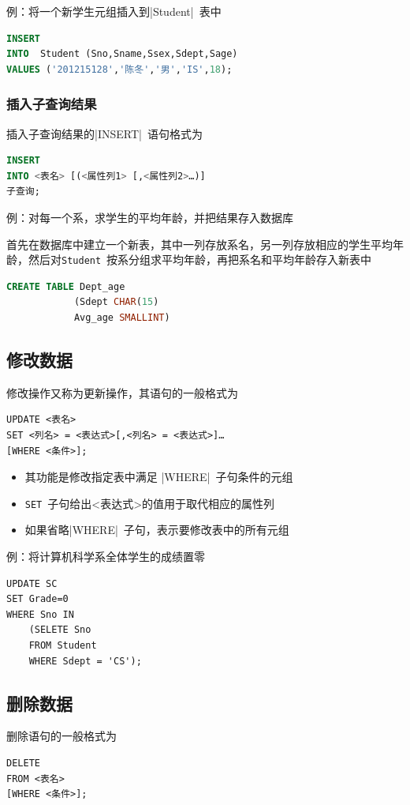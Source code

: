 例：将一个新学生元组插入到\sverb|Student|\ 表中
\begin{lstlisting}[language=sql]
INSERT
INTO  Student (Sno,Sname,Ssex,Sdept,Sage)
VALUES ('201215128','陈冬','男','IS',18);
\end{lstlisting}

\subsubsection{插入子查询结果}
插入子查询结果的\sverb|INSERT|\ 语句格式为
\begin{lstlisting}[language=sql]
INSERT 
INTO <表名> [(<属性列1> [,<属性列2>…)]
子查询;
\end{lstlisting}

例：对每一个系，求学生的平均年龄，并把结果存入数据库

首先在数据库中建立一个新表，其中一列存放系名，另一列存放相应的学生平均年龄，然后对\verb|Student|\ 按系分组求平均年龄，再把系名和平均年龄存入新表中
\begin{lstlisting}[language=sql]
CREATE TABLE Dept_age
            (Sdept CHAR(15)                         
            Avg_age SMALLINT)
\end{lstlisting}

\subsection{修改数据}
修改操作又称为更新操作，其语句的一般格式为
\begin{lstlisting}
UPDATE <表名>
SET <列名> = <表达式>[,<列名> = <表达式>]…
[WHERE <条件>];
\end{lstlisting}
\begin{itemize}
    \item 其功能是修改指定表中满足 \sverb|WHERE|\ 子句条件的元组
    \item \verb|SET|\ 子句给出<表达式>的值用于取代相应的属性列
    \item 如果省略\sverb|WHERE|\ 子句，表示要修改表中的所有元组
\end{itemize}

例：将计算机科学系全体学生的成绩置零
\begin{lstlisting}
UPDATE SC
SET Grade=0
WHERE Sno IN
	(SELETE Sno
    FROM Student
    WHERE Sdept = 'CS');
\end{lstlisting}

\subsection{删除数据}
删除语句的一般格式为
\begin{lstlisting}
DELETE
FROM <表名>
[WHERE <条件>];
\end{lstlisting}


